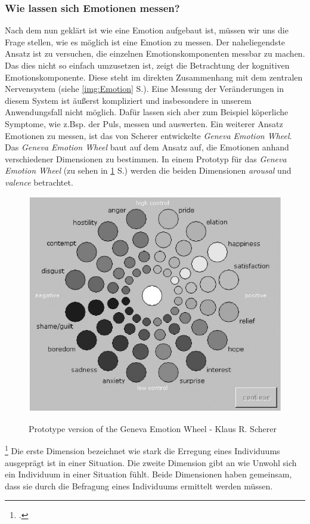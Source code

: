 \subsubsection{Wie lassen sich Emotionen messen?}
Nach dem nun geklärt ist wie eine Emotion aufgebaut ist, müssen wir uns die Frage stellen, wie es möglich ist eine Emotion zu messen. Der naheliegendste Ansatz ist zu versuchen, die einzelnen Emotionskomponenten messbar zu machen. Das dies nicht so einfach umzusetzen ist, zeigt die Betrachtung der kognitiven Emotionskomponente. Diese steht im direkten Zusammenhang mit dem zentralen Nervensystem (siehe \ref{img:Emotion} S.\pageref{img:Emotion}). Eine Messung der Veränderungen in diesem System ist äußerst kompliziert und insbesondere in unserem Anwendungsfall nicht möglich. Dafür lassen sich aber zum Beispiel köperliche Symptome, wie z.Bsp. der Puls, messen und auswerten.\newline
Ein weiterer Ansatz Emotionen zu messen, ist das von Scherer entwickelte \textit{Geneva Emotion Wheel}. Das \textit{Geneva Emotion Wheel} baut auf dem Ansatz auf, die Emotionen anhand verschiedener Dimensionen zu bestimmen. In einem Prototyp für das \textit{Geneva Emotion Wheel} (zu sehen in \ref{img:Geneva} S.\pageref{img:Geneva}) werden die beiden Dimensionen \textit{arousal} und \textit{valence} betrachtet.
\begin{figure}[h]
	\centering
	\includegraphics[width=12cm]{Bilder/Geneva-Emotion-Wheel.png}
	\label{img:Geneva}
	\caption[Prototype version of the Geneva Emotion Wheel - Klaus R. Scherer]{Prototype version of the Geneva Emotion Wheel - Klaus R. Scherer\footnotemark}
\end{figure}%
\footcitetext[Vgl.][S.723 Figure 2]{Kla05}
Die erste Dimension bezeichnet wie stark die Erregung eines Individuums ausgeprägt ist in einer Situation. Die zweite Dimension gibt an wie Unwohl sich ein Individuum in einer Situation fühlt. Beide Dimensionen haben gemeinsam, dass sie durch die Befragung eines Individuums ermittelt werden müssen. \newline \newline
